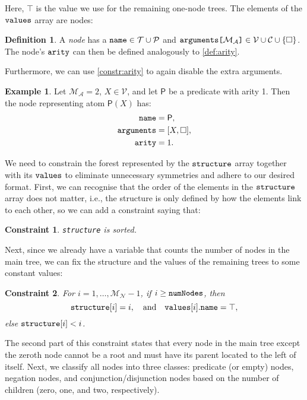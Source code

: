 \documentclass[letterpaper]{article}
\newtheorem{constraint}{Constraint}
\theoremstyle{definition}
\newtheorem{definition}{Definition}
\newtheorem{example}{Example}
\newcommand{\variable}[1]{\texttt{\textup{#1}}}
\newcommand{\arrayd}[3]{\variable{{#1}[}{#2}\variable{]} \in {#3}}
\newcommand{\predicates}{\mathcal{P}}
\newcommand{\variables}{\mathcal{V}}
\newcommand{\constants}{\mathcal{C}}
\newcommand{\tokens}{\mathcal{T}}
\newcommand{\maxArity}{\mathcal{M}_{\mathcal{A}}}
\newcommand{\maxNumNodes}{\mathcal{M}_{\mathcal{N}}}
\begin{document}
Here, $\top$ is the value we use for the remaining one-node trees. The
elements of the $\variable{values}$ array are nodes:

\begin{definition} \label{def:node}
  A \emph{node} has a $\variable{name} \in \tokens{} \cup \predicates{}$ and
  $\arrayd{arguments}{\maxArity{}}{\variables{} \cup \constants{} \cup \{ \Box
    \}}$. The node's $\variable{arity}$ can then be
  defined analogously to \cref{def:arity}.
\end{definition}

Furthermore, we can use \cref{constr:arity} to again disable the extra
arguments.

\begin{example}
  Let $\maxArity{} = 2$, $X \in \variables{}$, and let $\mathsf{P}$ be a
  predicate with arity 1. Then the node representing atom $\mathsf{P}(X)$ has:
  \begin{align*}
    \variable{name} &= \mathsf{P},\\
    \variable{arguments} &= [X, \Box],\\
    \variable{arity} &= 1.
  \end{align*}
\end{example}

We need to constrain the forest represented by the $\variable{structure}$
array together with its $\variable{values}$ to eliminate unnecessary symmetries
and adhere to our desired format. First, we can recognise that the order of the
elements in the $\variable{structure}$ array does not matter, i.e., the
structure is only defined by how the elements link to each other, so we can add
a constraint saying that:

\begin{constraint}
  \variable{structure} is sorted.
\end{constraint}

Next, since we already have a variable that counts the number of nodes in the
main tree, we can fix the structure and the values of the remaining trees to
some constant values:

\begin{constraint}
  For $i = 1, \dots, \maxNumNodes{} - 1$, if $i \ge \variable{numNodes}$, then
  \[
    \variable{structure}[i] = i, \quad \text{and} \quad
    \variable{values}[i].\variable{name} = \top,
  \]
  else $\variable{structure}[i] < i$.
\end{constraint}

The second part of this constraint states that every node in the main tree
except the zeroth node cannot be a root and must have its parent located to
the left of itself. Next, we classify all nodes into three classes: predicate
(or empty) nodes, negation nodes, and conjunction/disjunction nodes based on the
number of children (zero, one, and two, respectively).
\end{document}
